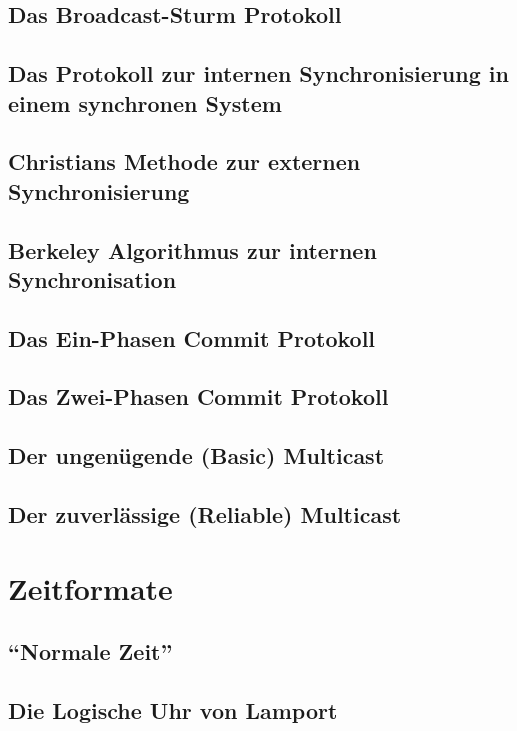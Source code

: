 \subsection{Das Broadcast-Sturm Protokoll}

\subsection{Das Protokoll zur internen Synchronisierung in einem synchronen System}

\subsection{Christians Methode zur externen Synchronisierung}

\subsection{Berkeley Algorithmus zur internen Synchronisation}

\subsection{Das Ein-Phasen Commit Protokoll}

\subsection{Das Zwei-Phasen Commit Protokoll}

\subsection{Der ungen\"{u}gende (Basic) Multicast}

\subsection{Der zuverl\"{a}ssige (Reliable) Multicast}

\section{Zeitformate}

\subsection{``Normale Zeit''}

\subsection{Die Logische Uhr von Lamport}

